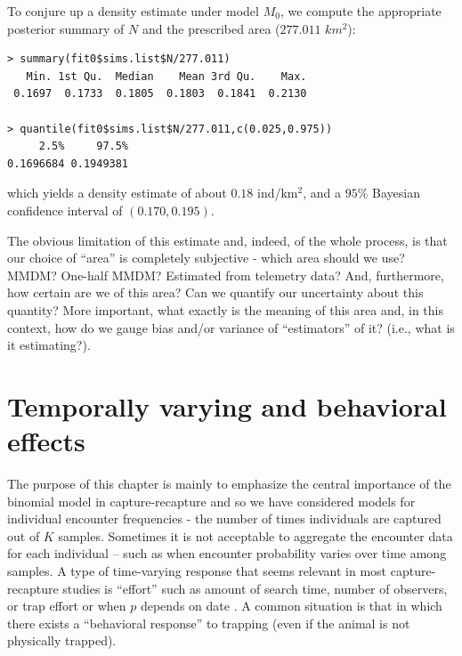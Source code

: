 To conjure up a
density estimate under model $M_0$, we compute the appropriate
posterior summary of $N$ and the prescribed area ($277.011$ $km^2$):
\begin{verbatim}
> summary(fit0$sims.list$N/277.011)
   Min. 1st Qu.  Median    Mean 3rd Qu.    Max.
 0.1697  0.1733  0.1805  0.1803  0.1841  0.2130

> quantile(fit0$sims.list$N/277.011,c(0.025,0.975))
     2.5%     97.5%
0.1696684 0.1949381
\end{verbatim}
which yields a density estimate of about $0.18$ ind/km$^2$, and a $95\%$ Bayesian
confidence interval of $(0.170, 0.195)$.

The obvious limitation of this estimate and, indeed, of the whole
process, is that our choice of ``area'' is completely subjective -
which area should we use? MMDM? One-half MMDM? Estimated from
telemetry data? And, furthermore, how certain are we of this area? Can
we quantify our uncertainty about this quantity?
 More important, what exactly is
the meaning of this area and, in this context, how do we gauge bias
and/or variance of ``estimators'' of it? (i.e., what is it
estimating?).

\section{Temporally varying and behavioral effects}

The purpose of this chapter is mainly to emphasize the central
importance of the binomial model in capture-recapture and so we have
considered models for individual encounter frequencies - the number of
times individuals are captured out of $K$ samples.  Sometimes it is
not acceptable to aggregate the encounter data for each individual --
such as when encounter probability varies over time among samples. A
type of time-varying response that seems relevant in most
capture-recapture studies is ``effort'' such as amount of search time,
number of observers, or trap effort
 or when $p$ depends on date
\citep{kery_etal:2010, gardner_etal:2010}.
  A common situation is that in
which there exists a ``behavioral response'' to trapping (even if the
animal is not physically trapped).

